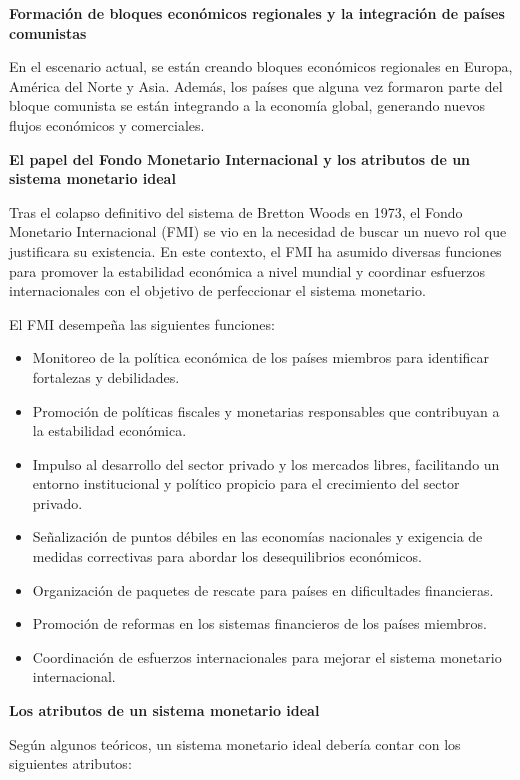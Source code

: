 \documentclass[
  jou,
  floatsintext,
  longtable,
  a4paper,
  nolmodern,
  notxfonts,
  notimes,
  12pt,
  colorlinks=true,linkcolor=blue,citecolor=blue,urlcolor=blue]{apa7}
\begin{document}
\textbf{Formación de bloques económicos regionales y la integración de
países comunistas}

En el escenario actual, se están creando bloques económicos regionales
en Europa, América del Norte y Asia. Además, los países que alguna vez
formaron parte del bloque comunista se están integrando a la economía
global, generando nuevos flujos económicos y comerciales.

\textbf{El papel del Fondo Monetario Internacional y los atributos de un
sistema monetario ideal}

Tras el colapso definitivo del sistema de Bretton Woods en 1973, el
Fondo Monetario Internacional (FMI) se vio en la necesidad de buscar un
nuevo rol que justificara su existencia. En este contexto, el FMI ha
asumido diversas funciones para promover la estabilidad económica a
nivel mundial y coordinar esfuerzos internacionales con el objetivo de
perfeccionar el sistema monetario.

El FMI desempeña las siguientes funciones:

\begin{itemize}
\item
  Monitoreo de la política económica de los países miembros para
  identificar fortalezas y debilidades.
\item
  Promoción de políticas fiscales y monetarias responsables que
  contribuyan a la estabilidad económica.
\item
  Impulso al desarrollo del sector privado y los mercados libres,
  facilitando un entorno institucional y político propicio para el
  crecimiento del sector privado.
\item
  Señalización de puntos débiles en las economías nacionales y exigencia
  de medidas correctivas para abordar los desequilibrios económicos.
\item
  Organización de paquetes de rescate para países en dificultades
  financieras.
\item
  Promoción de reformas en los sistemas financieros de los países
  miembros.
\item
  Coordinación de esfuerzos internacionales para mejorar el sistema
  monetario internacional.
\end{itemize}

\textbf{Los atributos de un sistema monetario ideal}

Según algunos teóricos, un sistema monetario ideal debería contar con
los siguientes atributos:
\end{document}
